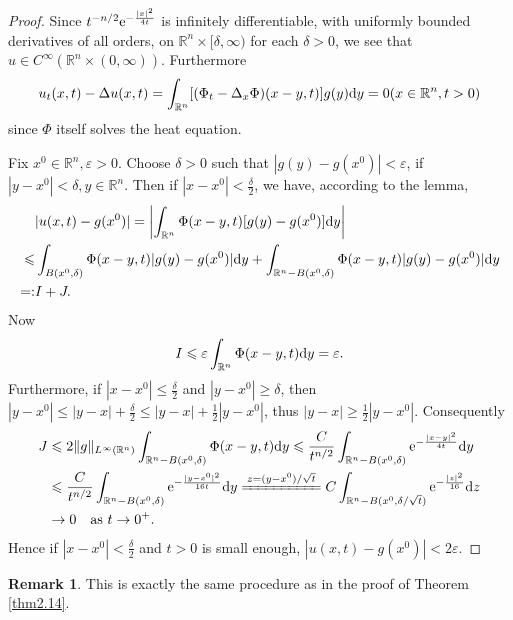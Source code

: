 \documentclass[hyperref,UTF8,12pt]{article}
\numberwithin{equation}{subsection}
\theoremstyle{plain}
\theoremstyle{definition}
\newtheorem{remark}{Remark}
\numberwithin{theorem}{section}
\numberwithin{lemma}{section}
\numberwithin{proposition}{section}
\numberwithin{remark}{section}
\numberwithin{corollary}{section}
\numberwithin{definition}{section}
\numberwithin{problem}{section}
\numberwithin{example}{section}
\def\e{\textup{e}}
\def\dif{\textup{d}}
\newcommand{\mr}{\mathbb{R}}
\renewcommand{\leq}{\leqslant}
\renewcommand{\geq}{\geqslant}
\newcommand{\ve}{\varepsilon}
\begin{document}
\begin{proof}
Since $t^{-n/2}\e^{-\frac{|x|^2}{4t}}$ is infinitely differentiable, with uniformly bounded derivatives of all orders, on $\mr^n\times[\delta,\infty)$ for each $\delta>0$, we see that $u \in C^\infty(\mr^n\times(0,\infty))$. Furthermore\[u_t(x,t)-\Delta u(x,t)=\int_{\mr^n} [(\Phi_t-\Delta_x\Phi)(x-y,t)]g(y)\dif y=0(x\in\mr^n,t>0)\]since $\Phi$ itself solves the heat equation.

Fix $x^0\in\mr^n,\ve>0$. Choose $\delta>0$ such that $|g(y)-g(x^0)|<\ve$, if $|y-x^0|<\delta,y\in\mr^n$. Then if $|x-x^0|<\frac{\delta}{2}$, we have, according to the lemma,\[\begin{aligned}
	&|u(x, t)-g(x^0)|=\left|\int_{\mr^n}\Phi(x-y,t)[g(y)-g(x^0)]\dif y\right| \\
	\leq&\int_{B(x^0,\delta)}\Phi(x-y,t)|g(y)-g(x^0)|\dif y+\int_{\mr^n-B(x^0,\delta)}\Phi(x-y,t)|g(y)-g(x^0)|\dif y\\
	=:&I+J.
\end{aligned}\]Now\[I\leq\ve\int_{\mr^n}\Phi(x-y,t)\dif y=\ve.\]Furthermore, if $|x-x^0| \leq\frac{\delta}{2}$ and $|y-x^0|\geq\delta$, then $|y-x^0|\leq|y-x|+\frac{\delta}{2}\leq |y-x|+\frac{1}{2}|y-x^0|$, thus $|y-x|\geq\frac{1}{2}|y-x^0|$. Consequently\[\begin{aligned}
J&\leq2\|g\|_{L^\infty(\mr^n)}\int_{\mr^n-B(x^0,\delta)}\Phi(x-y,t)\dif y\leq\frac{C}{t^{n/2}}\int_{\mr^n-B(x^0,\delta)}\e^{-\frac{|x-y|^2}{4t}}\dif y\\
&\leq\frac{C}{t^{n/2}}\int_{\mr^n-B(x^0,\delta)}\e^{-\frac{|y-x^0|^2}{16t}}\dif y\xlongequal{z=(y-x^0)/\sqrt{t}}C\int_{\mr^n-B(x^0,\delta/\sqrt{t})}\e^{-\frac{|z|^2}{16}}\dif z\\
&\to0\quad\text{as } t\to0^+.
\end{aligned}\]Hence if $|x-x^0|<\frac{\delta}{2}$ and $t>0$ is small enough, $|u(x,t)-g(x^0)|<2\ve$.
\end{proof}
\begin{remark}
This is exactly the same procedure as in the proof of Theorem \ref{thm2.14}.
\end{remark}
\end{document}

